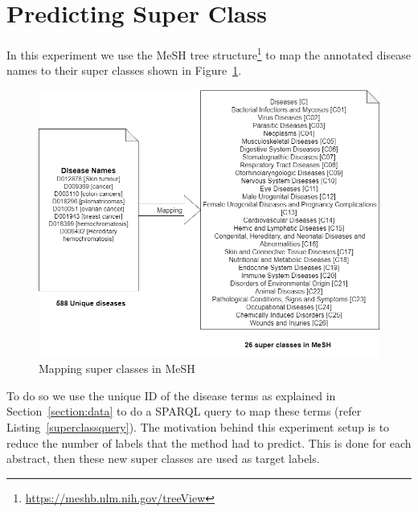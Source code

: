 \section{Predicting Super Class}
In this experiment we use the MeSH tree structure\footnote{\url{https://meshb.nlm.nih.gov/treeView}} to map the annotated disease names to their super classes shown in Figure~\ref{fig:meshsuperclass}. 
\begin{figure}[!htb]
    \centering
    \includegraphics[scale=0.45]{Figures/NN_prediction.png}
    \caption{Mapping super classes in MeSH}
    \label{fig:meshsuperclass}
\end{figure}
To do so we use the unique ID of the disease terms as explained in Section~\ref{section:data} to do a SPARQL query to map these terms (refer Listing~\ref{superclassquery}). The motivation behind this experiment setup is to reduce the number of labels that the method had to predict. This is done for each abstract, then these new super classes are used as target labels. 

